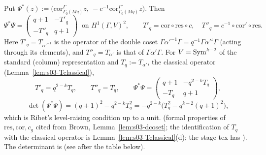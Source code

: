 \begin{proposition}[$\Psi^*\Psi$]\label{prop:s03-PsiPsi}
Put $\Psi^*(z):=\big(\mathrm{cor}^\Gamma_{\Gamma_0(Mq)}z,\ -c^{-1}\mathrm{cor}^{\Gamma'}_{\Gamma_0(Mq)}z\big)$. Then
\[\Psi^*\Psi=\begin{pmatrix}q+1&-T'_q\\-T''_q&q+1\end{pmatrix}\ \text{ on }H^1(\Gamma,V)^2,\qquad
T'_q=\mathrm{cor}\circ\mathrm{res}\circ c,\quad T''_q=c^{-1}\circ\mathrm{cor}'\circ\mathrm{res}.\]
Here $T'_q=T_{\alpha'^{-1}}$ is the operator of the double coset $\Gamma\alpha'^{-1}\Gamma=q^{-1}\Gamma\alpha'^\iota\Gamma$ (acting through its elements), and
$T''_q=T_{\alpha'}$ is that of $\Gamma\alpha'\Gamma$. For $V=\mathrm{Sym}^{k-2}$ of the standard (column) representation and $T_q:=T_{\alpha'}$, the classical
operator (Lemma~\ref{lem:s03-Tclassical}),
\[T'_q=q^{2-k}T_q,\qquad T''_q=T_q,\qquad \Psi^*\Psi=\begin{pmatrix}q+1&-q^{2-k}T_q\\-T_q&q+1\end{pmatrix},\]
\[\det(\Psi^*\Psi)=(q+1)^2-q^{2-k}T_q^2=-q^{2-k}\big(T_q^2-q^{k-2}(q+1)^2\big),\]
which is Ribet's level-raising condition up to a unit. \stpmc{} (formal properties of $\mathrm{res},\mathrm{cor},c_g$ cited from Brown, Lemma~\ref{lem:s03-dcoset};
the identification of $T_q$ with the classical operator is Lemma~\ref{lem:s03-Tclassical}(d); the stage tex has \sttoprove). The determinant is \stcomp{}
(see after the table below).
\end{proposition}

